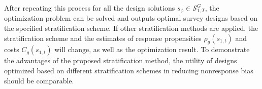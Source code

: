 \documentclass[12pt]{article}
\begin{document}
After repeating this process for all the design solutions $s_\phi \in \mathcal{S}^G_{1,T}$, the optimization problem can be solved and outputs optimal survey designs based on the specified stratification scheme.
If other stratification methods are applied, the stratification scheme and the estimates of response propensities $\rho_g(s_{1,t})$ and costs $C_g(s_{1,t})$ will change, as well as the optimization result.
To demonstrate the advantages of the proposed stratification method, the utility of designs optimized based on different stratification schemes in reducing nonresponse bias should be comparable.






\end{document}
